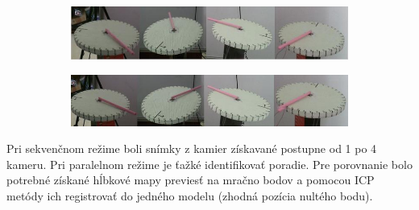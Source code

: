 \begin{figure}[h]
	\centering
	\begin{subfigure}[b]{\textwidth}
		\centering
		\includegraphics[width=\textwidth]{figures/dynamic_sequence.png}
		\label{fig:dynamic:sequence}
	\end{subfigure}
	\vfill
	\begin{subfigure}[b]{\textwidth}
		\centering
		\includegraphics[width=\textwidth]{figures/dynamic_parallel.png}
		\label{fig:dynamic:parallel}
	\end{subfigure}
	\caption{}
	\label{fig:dynamic:results}
\end{figure}

Pri sekvenčnom režime boli snímky z kamier získavané postupne od 1 po 4 kameru. Pri paralelnom režime je ťažké identifikovať poradie. Pre porovnanie bolo potrebné získané hĺbkové mapy previesť na mračno bodov a pomocou ICP metódy ich registrovať do jedného modelu (zhodná pozícia nultého bodu). 

